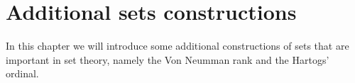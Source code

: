 \section{Additional sets constructions}
In this chapter we will introduce some additional constructions of sets that are important 
in set theory, namely the Von Neumman rank and the Hartogs' ordinal.


